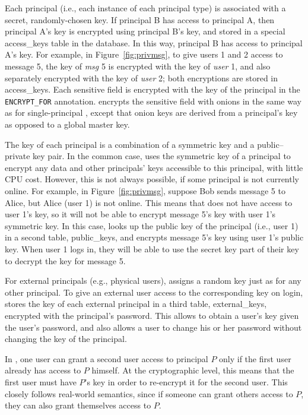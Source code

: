Each principal (i.e., each instance of each principal type) is associated
with a secret, randomly-chosen key.  If principal B has access to
principal A, then principal A's key is encrypted using principal B's
key, and stored in a special \textsf{access\_keys} table in the database.
In this way, principal B has access to principal A's key.  For example,
in Figure~\ref{fig:privmsg}, to give users 1 and 2 access to message 5,
the key of {\em msg} 5 is encrypted with the key of {\em user} 1, and
also separately encrypted with the key of {\em user} 2; both encryptions
are stored in \textsf{access\_keys}.  Each sensitive
field is encrypted with the key of the principal in the {\small \tt
ENCRYPT\_FOR} annotation. \name{} encrypts the sensitive field with
onions in the same way as for single-principal \name,
except that onion keys are derived from a principal's key as opposed to
a global master key.

The key of each principal is  a combination of a symmetric key
and a public--private key pair.  In the common case, \name uses the
symmetric key of a principal to encrypt any data and other principals'
keys accessible to this principal, with little CPU cost.  However, this is not always
possible, if some principal is not currently online.  For example,
in Figure~\ref{fig:privmsg}, suppose Bob sends message 5 to Alice, but
Alice (user 1) is not online.  This means that \name does not have access
to user 1's key, so it will not be able to encrypt message 5's key with
user 1's symmetric key.  In this case, \name looks up the public key
of the principal (i.e., user 1) in a second table, \textsf{public\_keys}, and encrypts
message 5's key using user 1's public key.  When user 1 logs in, they
will be able to use the secret key part of their key to decrypt the
key for message 5.

For external principals (e.g., physical users), \name assigns a
random key just as for any other principal.  To give an external user
access to the corresponding key on login, \name stores the key of each
external principal in a third table, \textsf{external\_keys}, encrypted
with the principal's password.  This allows \name to obtain a user's
key given the user's password, and also allows a user to change his or
her password without changing the key of the principal.

In \name{}, one user can grant a second user access to principal $P$
only if the first user already has access to $P$ himself.  At the
cryptographic level, this means that the first user must have $P$'s
key in order to re-encrypt it for the second user.  This closely
follows real-world semantics, since if someone can grant others
access to $P$, they can also grant themselves access to $P$.

